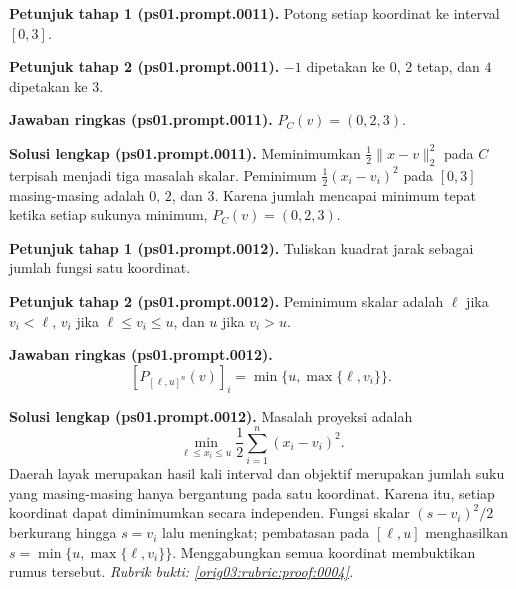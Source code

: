 \par\noindent\textbf{Petunjuk tahap 1 (ps01.prompt.0011).}
Potong setiap koordinat ke interval $[0,3]$.
\label{orig03:ps01:hint1:0011}
\par\noindent\textbf{Petunjuk tahap 2 (ps01.prompt.0011).}
$-1$ dipetakan ke $0$, $2$ tetap, dan $4$ dipetakan ke $3$.
\label{orig03:ps01:hint2:0011}
\par\noindent\textbf{Jawaban ringkas (ps01.prompt.0011).}
$P_C(v)=(0,2,3)$.
\label{orig03:ps01:answer:0011}
\par\noindent\textbf{Solusi lengkap (ps01.prompt.0011).}
Meminimumkan $\tfrac12\lVert x-v\rVert_2^2$ pada $C$ terpisah menjadi tiga
masalah skalar. Peminimum $\tfrac12(x_i-v_i)^2$ pada $[0,3]$ masing-masing
adalah $0$, $2$, dan $3$. Karena jumlah mencapai minimum tepat ketika setiap
sukunya minimum, $P_C(v)=(0,2,3)$.
\label{orig03:ps01:solution:0011}

\par\noindent\textbf{Petunjuk tahap 1 (ps01.prompt.0012).}
Tuliskan kuadrat jarak sebagai jumlah fungsi satu koordinat.
\label{orig03:ps01:hint1:0012}
\par\noindent\textbf{Petunjuk tahap 2 (ps01.prompt.0012).}
Peminimum skalar adalah $\ell$ jika $v_i<\ell$, $v_i$ jika
$\ell\leq v_i\leq u$, dan $u$ jika $v_i>u$.
\label{orig03:ps01:hint2:0012}
\par\noindent\textbf{Jawaban ringkas (ps01.prompt.0012).}
\[
 [P_{[\ell,u]^n}(v)]_i=\min\{u,\max\{\ell,v_i\}\}.
\]
\label{orig03:ps01:answer:0012}
\par\noindent\textbf{Solusi lengkap (ps01.prompt.0012).}
Masalah proyeksi adalah
\[
 \min_{\ell\leq x_i\leq u}\frac12\sum_{i=1}^n(x_i-v_i)^2.
\]
Daerah layak merupakan hasil kali interval dan objektif merupakan jumlah
suku yang masing-masing hanya bergantung pada satu koordinat. Karena itu,
setiap koordinat dapat diminimumkan secara independen. Fungsi skalar
$(s-v_i)^2/2$ berkurang hingga $s=v_i$ lalu meningkat; pembatasan pada
$[\ell,u]$ menghasilkan $s=\min\{u,\max\{\ell,v_i\}\}$. Menggabungkan semua
koordinat membuktikan rumus tersebut.
\emph{Rubrik bukti: \ref{orig03:rubric:proof:0004}.}
\label{orig03:ps01:solution:0012}
